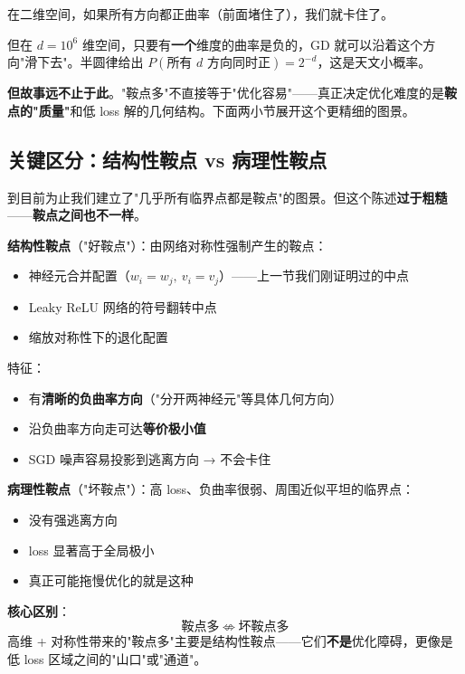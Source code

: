 \documentclass[12pt, a4paper]{ctexart}
\begin{document}
\begin{insight}
在二维空间，如果所有方向都正曲率（前面堵住了），我们就卡住了。

但在 $d = 10^6$ 维空间，只要有\textbf{一个}维度的曲率是负的，GD 就可以沿着这个方向"滑下去"。半圆律给出 $P(\text{所有 }d\text{ 方向同时正}) = 2^{-d}$，这是天文小概率。

\textbf{但故事远不止于此}。"鞍点多"不直接等于"优化容易"——真正决定优化难度的是\textbf{鞍点的"质量"}和低 loss 解的几何结构。下面两小节展开这个更精细的图景。
\end{insight}

\subsection{关键区分：结构性鞍点 vs 病理性鞍点}

到目前为止我们建立了"几乎所有临界点都是鞍点"的图景。但这个陈述\textbf{过于粗糙}——\textbf{鞍点之间也不一样}。

\begin{keypoint}[鞍点的两种类型]

\textbf{结构性鞍点}（"好鞍点"）：由网络对称性强制产生的鞍点：
\begin{itemize}
    \item 神经元合并配置（$w_i = w_j,\ v_i = v_j$）——上一节我们刚证明过的中点
    \item Leaky ReLU 网络的符号翻转中点
    \item 缩放对称性下的退化配置
\end{itemize}
特征：
\begin{itemize}
    \item 有\textbf{清晰的负曲率方向}（"分开两神经元"等具体几何方向）
    \item 沿负曲率方向走可达\textbf{等价极小值}
    \item SGD 噪声容易投影到逃离方向 → 不会卡住
\end{itemize}

\textbf{病理性鞍点}（"坏鞍点"）：高 loss、负曲率很弱、周围近似平坦的临界点：
\begin{itemize}
    \item 没有强逃离方向
    \item loss 显著高于全局极小
    \item 真正可能拖慢优化的就是这种
\end{itemize}

\textbf{核心区别}：
\[
\boxed{\text{鞍点多} \ \not\Longleftrightarrow\ \text{坏鞍点多}}
\]
高维 + 对称性带来的"鞍点多"主要是结构性鞍点——它们\textbf{不是}优化障碍，更像是低 loss 区域之间的"山口"或"通道"。
\end{keypoint}
\end{document}
